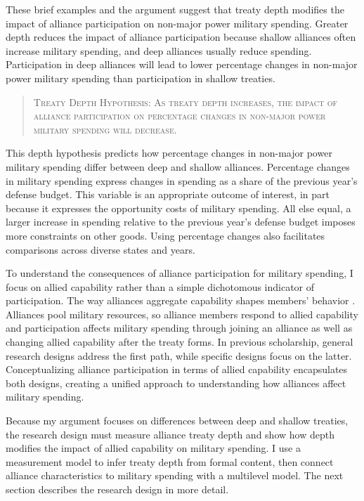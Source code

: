 \documentclass[12pt]{article}
\begin{document}
 
These brief examples and the argument suggest that treaty depth modifies the impact of alliance participation on non-major power military spending. 
Greater depth reduces the impact of alliance participation because shallow alliances often increase military spending, and deep alliances usually reduce spending.  
Participation in deep alliances will lead to lower percentage changes in non-major power military spending than participation in shallow treaties. 
 

\begin{quote}
\textsc{Treaty Depth Hypothesis: As treaty depth increases, the impact of alliance participation on percentage changes in non-major power military spending will decrease.}
\end{quote}


This depth hypothesis predicts how percentage changes in non-major power military spending differ between deep and shallow alliances. 
Percentage changes in military spending express changes in spending as a share of the previous year's defense budget.
This variable is an appropriate outcome of interest, in part because it expresses the opportunity costs of military spending. 
All else equal, a larger increase in spending relative to the previous year's defense budget imposes more constraints on other goods. 
Using percentage changes also facilitates comparisons across diverse states and years. 


To understand the consequences of alliance participation for military spending, I focus on allied capability rather than a simple dichotomous indicator of participation.
The way alliances aggregate capability shapes members' behavior \citep{FordhamPoast2014}. 
Alliances pool military resources, so alliance members respond to allied capability and participation affects military spending through joining an alliance as well as changing allied capability after the treaty forms. 
In previous scholarship, general research designs address the first path, while specific designs focus on the latter. 
Conceptualizing alliance participation in terms of allied capability encapsulates both designs, creating a unified approach to understanding how alliances affect military spending. 


Because my argument focuses on differences between deep and shallow treaties, the research design must measure alliance treaty depth and show how depth modifies the impact of allied capability on military spending.  
I use a measurement model to infer treaty depth from formal content, then connect alliance characteristics to military spending with a multilevel model. 
The next section describes the research design in more detail. 
\end{document}
